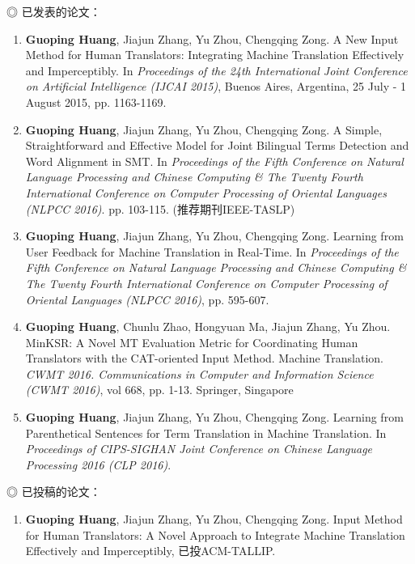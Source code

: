 \noindent ◎ 已发表的论文：

\begin{enumerate}[(1)]
	\item \textbf{Guoping Huang}, Jiajun Zhang, Yu Zhou, Chengqing Zong. A New Input Method for Human Translators: Integrating Machine Translation Effectively and Imperceptibly. In \textit{Proceedings of the 24th International Joint Conference on Artificial Intelligence (IJCAI 2015)}, Buenos Aires, Argentina, 25 July - 1 August 2015, pp. 1163-1169.
	
	\item \textbf{Guoping Huang}, Jiajun Zhang, Yu Zhou, Chengqing Zong. A Simple, Straightforward and Effective Model for Joint Bilingual Terms Detection and Word Alignment in SMT. In \textit{Proceedings of the Fifth Conference on Natural Language Processing and Chinese Computing \& The Twenty Fourth International Conference on Computer Processing of Oriental Languages (NLPCC 2016)}. pp. 103-115. (推荐期刊IEEE-TASLP)
	
	\item \textbf{Guoping Huang}, Jiajun Zhang, Yu Zhou, Chengqing Zong. Learning from User Feedback for Machine Translation in Real-Time. In \textit{Proceedings of the Fifth Conference on Natural Language Processing and Chinese Computing \& The Twenty Fourth International Conference on Computer Processing of Oriental Languages (NLPCC 2016)}, pp. 595-607.
	
	\item \textbf{Guoping Huang}, Chunlu Zhao, Hongyuan Ma, Jiajun Zhang, Yu Zhou. MinKSR: A Novel MT Evaluation Metric for Coordinating Human Translators with the CAT-oriented Input Method. Machine Translation. \textit{CWMT 2016. Communications in Computer and Information Science (CWMT 2016)}, vol 668, pp. 1-13. Springer, Singapore
	
	\item \textbf{Guoping Huang}, Jiajun Zhang, Yu Zhou, Chengqing Zong. Learning from Parenthetical Sentences for Term Translation in Machine Translation. In \textit{Proceedings of CIPS-SIGHAN Joint Conference on Chinese Language Processing 2016 (CLP 2016)}.
\end{enumerate}

\noindent ◎ 已投稿的论文：

\begin{enumerate}[(1)]
	\item \textbf{Guoping Huang}, Jiajun Zhang, Yu Zhou, Chengqing Zong. Input Method for Human Translators: A Novel Approach to Integrate Machine Translation Effectively and Imperceptibly, 已投ACM-TALLIP.
\end{enumerate}

